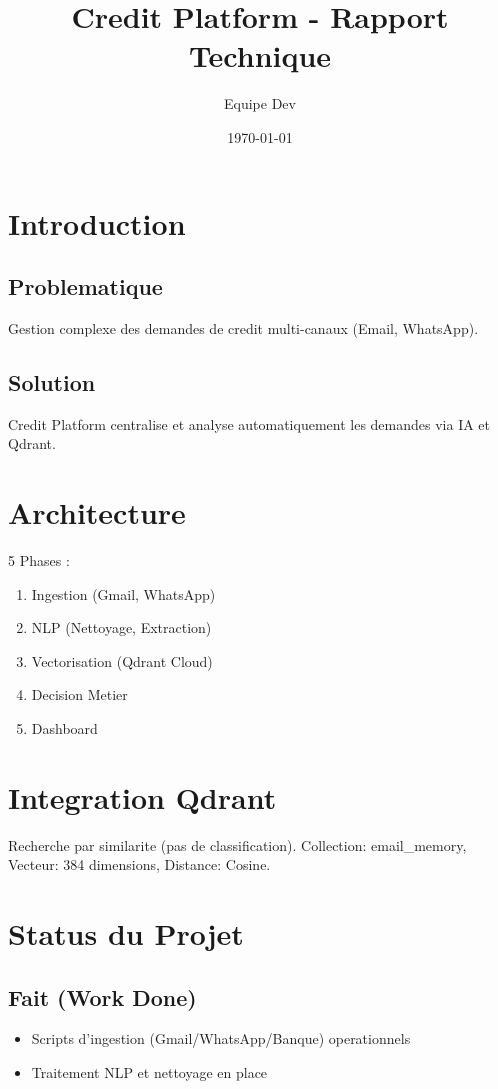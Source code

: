 \documentclass[11pt]{article}
\title{Credit Platform - Rapport Technique}
\author{Equipe Dev}
\date{\today}
\begin{document}
\maketitle
\tableofcontents
\newpage

\section{Introduction}
\subsection{Problematique}
Gestion complexe des demandes de credit multi-canaux (Email, WhatsApp).
\subsection{Solution}
Credit Platform centralise et analyse automatiquement les demandes via IA et Qdrant.

\section{Architecture}
5 Phases :
\begin{enumerate}
    \item Ingestion (Gmail, WhatsApp)
    \item NLP (Nettoyage, Extraction)
    \item Vectorisation (Qdrant Cloud)
    \item Decision Metier
    \item Dashboard
\end{enumerate}

\section{Integration Qdrant}
Recherche par similarite (pas de classification).
Collection: email\_memory, Vecteur: 384 dimensions, Distance: Cosine.

\section{Status du Projet}
\subsection{Fait (Work Done)}
\begin{itemize}
    \item Scripts d'ingestion (Gmail/WhatsApp/Banque) operationnels
    \item Traitement NLP et nettoyage en place
\end{itemize}
\end{document}
